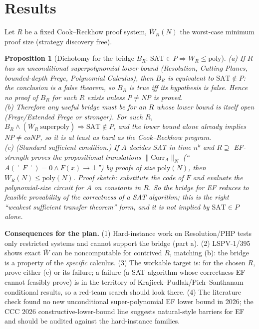 \documentclass[11pt]{article}
\newtheorem{proposition}{Proposition}
\begin{document}
\section*{Results}
Let $R$ be a fixed Cook--Reckhow proof system, $\overline W_R(N)$ the worst-case minimum proof size (strategy discovery free).
\begin{proposition}[Dichotomy for the bridge $B_R$: $\mathrm{SAT}\in P\Rightarrow \overline W_R\le \mathrm{poly}$]
(a) If $R$ has an unconditional superpolynomial lower bound (Resolution, Cutting Planes, bounded-depth Frege, Polynomial Calculus), then $B_R$ is \emph{equivalent} to $\mathrm{SAT}\notin P$: the conclusion is a false theorem, so $B_R$ is true iff its hypothesis is false. Hence no proof of $B_R$ for such $R$ exists unless P$\ne$NP is proved.\\
(b) Therefore any useful bridge must be for an $R$ whose lower bound is itself open (Frege/Extended Frege or stronger). For such $R$, $B_R\wedge(\overline W_R\ \text{superpoly})\Rightarrow \mathrm{SAT}\notin P$, and the lower bound alone already implies NP$\ne$coNP, so it is at least as hard as the Cook--Reckhow program.\\
(c) (Standard sufficient condition.) If $A$ decides SAT in time $n^k$ and $R\supseteq$ EF-strength proves the propositional translations $\|\mathrm{Corr}_A\|_N$ (``$A(\ulcorner F\urcorner)=0\wedge F(x)\to\bot$'') by proofs of size $\mathrm{poly}(N)$, then $\overline W_R(N)\le\mathrm{poly}(N)$. Proof sketch: substitute the code of $F$ and evaluate the polynomial-size circuit for $A$ on constants in $R$. So the bridge for EF reduces to \emph{feasible provability of the correctness of a SAT algorithm}; this is the right ``weakest sufficient transfer theorem'' form, and it is not implied by $\mathrm{SAT}\in P$ alone.
\end{proposition}
\textbf{Consequences for the plan.} (1) Hard-instance work on Resolution/PHP tests only restricted systems and cannot support the bridge (part a). (2) LSPV-1/395 shows exact $\overline W$ can be noncomputable for contrived $R$, matching (b): the bridge is a property of the \emph{specific} calculus. (3) The workable target is: for the chosen $R$, prove either (c) or its failure; a failure (a SAT algorithm whose correctness EF cannot feasibly prove) is in the territory of Krajicek--Pudlak/Pich--Santhanam conditional results, so a red-team search should look there. (4) The literature check found no new unconditional super-polynomial EF lower bound in 2026; the CCC 2026 constructive-lower-bound line suggests natural-style barriers for EF and should be audited against the hard-instance families.
\end{document}
